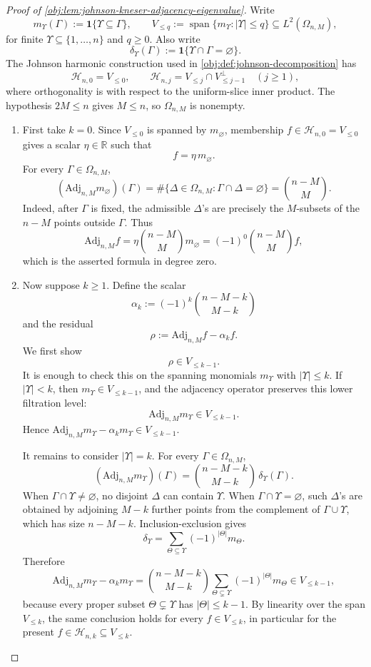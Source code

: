 \documentclass[11pt]{article}
\begin{document}
\begin{proof}[Proof of \cref{obj:lem:johnson-kneser-adjacency-eigenvalue}]
Write
\[
m_{\Upsilon}(\Gamma):=\mathbf 1\{\Upsilon\subseteq \Gamma\},
\qquad
V_{\le q}:=\operatorname{span}\{m_{\Upsilon}:|\Upsilon|\le q\}\subseteq L^2(\Omega_{n,M}),
\]
for finite \(\Upsilon\subseteq\{1,\ldots,n\}\) and \(q\ge 0\). Also write
\[
\delta_{\Upsilon}(\Gamma):=\mathbf 1\{\Upsilon\cap\Gamma=\varnothing\}.
\]
The Johnson harmonic construction used in \cref{obj:def:johnson-decomposition} has
\[
\mathcal H_{n,0}=V_{\le 0},
\qquad
\mathcal H_{n,j}=V_{\le j}\cap V_{\le j-1}^{\perp}\quad(j\ge 1),
\]
where orthogonality is with respect to the uniform-slice inner product. The hypothesis \(2M\le n\) gives \(M\le n\), so \(\Omega_{n,M}\) is nonempty.

\begin{enumerate}
\item First take \(k=0\). Since \(V_{\le 0}\) is spanned by \(m_{\varnothing}\), membership \(f\in\mathcal H_{n,0}=V_{\le 0}\) gives a scalar \(\eta\in\mathbb R\) such that
\[
f=\eta\,m_{\varnothing}.
\]
For every \(\Gamma\in\Omega_{n,M}\),
\[
(\mathrm{Adj}_{n,M}m_{\varnothing})(\Gamma)
=
\#\{\Delta\in\Omega_{n,M}:\Gamma\cap\Delta=\varnothing\}
=
\binom{n-M}{M}.
\]
Indeed, after \(\Gamma\) is fixed, the admissible \(\Delta\)'s are precisely the \(M\)-subsets of the \(n-M\) points outside \(\Gamma\). Thus
\[
\mathrm{Adj}_{n,M}f
=
\eta\binom{n-M}{M}m_{\varnothing}
=
(-1)^0\binom{n-M}{M}f,
\]
which is the asserted formula in degree zero. %

\item Now suppose \(k\ge 1\). Define the scalar
\[
\alpha_k:=(-1)^k\binom{n-M-k}{M-k}
\]
and the residual
\[
\rho:=\mathrm{Adj}_{n,M}f-\alpha_k f.
\]
We first show
\[
\rho\in V_{\le k-1}.
\]
It is enough to check this on the spanning monomials \(m_{\Upsilon}\) with \(|\Upsilon|\le k\). If \(|\Upsilon|<k\), then \(m_{\Upsilon}\in V_{\le k-1}\), and the adjacency operator preserves this lower filtration level:
\[
\mathrm{Adj}_{n,M}m_{\Upsilon}\in V_{\le k-1}.
\]
Hence \(\mathrm{Adj}_{n,M}m_{\Upsilon}-\alpha_km_{\Upsilon}\in V_{\le k-1}\).

It remains to consider \(|\Upsilon|=k\). For every \(\Gamma\in\Omega_{n,M}\),
\[
(\mathrm{Adj}_{n,M}m_{\Upsilon})(\Gamma)
=
\binom{n-M-k}{M-k}\,\delta_{\Upsilon}(\Gamma).
\]
When \(\Gamma\cap\Upsilon\ne\varnothing\), no disjoint \(\Delta\) can contain \(\Upsilon\). When \(\Gamma\cap\Upsilon=\varnothing\), such \(\Delta\)'s are obtained by adjoining \(M-k\) further points from the complement of \(\Gamma\cup\Upsilon\), which has size \(n-M-k\). Inclusion-exclusion gives
\[
\delta_{\Upsilon}
=
\sum_{\Theta\subseteq\Upsilon}(-1)^{|\Theta|}m_{\Theta}.
\]
Therefore
\[
\mathrm{Adj}_{n,M}m_{\Upsilon}-\alpha_km_{\Upsilon}
=
\binom{n-M-k}{M-k}
\sum_{\Theta\subsetneq\Upsilon}(-1)^{|\Theta|}m_{\Theta}\in V_{\le k-1},
\]
because every proper subset \(\Theta\subsetneq\Upsilon\) has \(|\Theta|\le k-1\). By linearity over the span \(V_{\le k}\), the same conclusion holds for every \(f\in V_{\le k}\), in particular for the present \(f\in\mathcal H_{n,k}\subseteq V_{\le k}\). %


\end{enumerate}
\end{proof}
\end{document}

